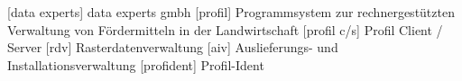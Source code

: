 
\begin{acronym}
    
          [data experts]  {data experts gmbh}
       [profil]        {Programmsystem zur rechnergestützten Verwaltung von Fördermitteln in der Landwirtschaft}
          [profil c/s]    {Profil Client / Server}
          [rdv]           {Rasterdatenverwaltung}
          [aiv]           {Auslieferungs- und Installationsverwaltung}
    [profident]     {Profil-Ident}

\end{acronym}